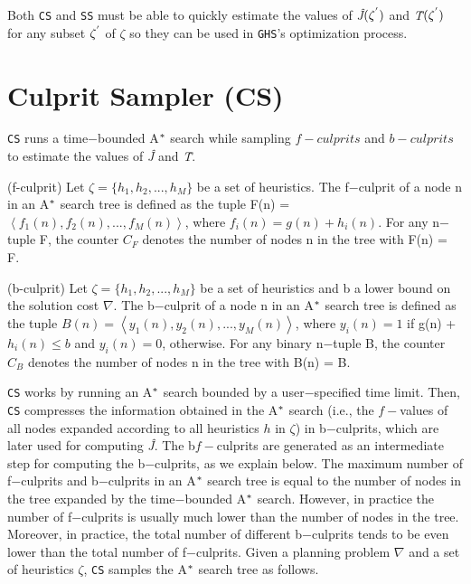 Both \texttt{CS} and \texttt{SS} must be able to quickly estimate the values of \textit{\^{J}}$(\zeta\sp{'})$ and \textit{\^{T}}$(\zeta\sp{'})$ for any subset $\zeta\sp{'}$ of $\zeta$ so they can be used in \texttt{GHS}'s optimization process.

\section{Culprit Sampler (CS)}
\noindent
\texttt{CS} runs a time$-$bounded A$\sp{*}$ search while sampling $f-culprits$ and $b-culprits$ to estimate the values of \textit{\^{J}} and \textit{\^{T}}.

\begin{definition}(f-culprit)
Let $\zeta = \{h_{1}, h_{2},...,h_{M}\}$ be a set of heuristics. The f$-$culprit of a node n in an A$\sp{*}$ search tree is defined as the tuple F(n) = $\left\langle f_{1}(n), f_{2}(n),...,f_{M}(n)  \right\rangle$, where $f_{i}(n) = g(n)+h_{i}(n)$. For any n$-$tuple F, the counter $C_{F}$ denotes the number of nodes n in the tree with F(n) = F.
\label{def:def_fculprits}
\end{definition}

\begin{definition}(b-culprit)
Let $\zeta = \{h_{1}, h_{2},...,h_{M}\}$ be a set of heuristics and b a lower bound on the solution cost $\nabla$. The b$-$culprit of a node n in an A$\sp{*}$ search tree is defined as the tuple $B(n) = \left\langle y_{1}(n), y_{2}(n),...,y_{M}(n)\right\rangle$, where $y_{i}(n) = 1$ if g(n) + $h_{i}(n) \leq b$ and $y_{i}(n) = 0$, otherwise.  For any binary n$-$tuple B, the counter $C_{B}$ denotes the number of nodes n in the tree with B(n) = B.
\label{def:def_bculprits}
\end{definition}

\texttt{CS} works by running an A$\sp{*}$ search bounded by a user$-$specified time limit. Then, \texttt{CS} compresses the information obtained in the A$\sp{*}$ search (\textsf{i.e.,} the $f-$values of all nodes expanded according to all heuristics $h$ in $\zeta$) in b$-$culprits, which are later used for computing \textit{\^{J}}. The b$f-$culprits are generated as an intermediate step for computing the b$-$culprits, as we explain below. The maximum number of f$-$culprits and b$-$culprits in an A$\sp{*}$ search tree is equal to the number of nodes in the tree expanded by the time$-$bounded A$\sp{*}$ search. However, in practice the number of f$-$culprits is usually much lower than the number of nodes in the tree. Moreover, in practice, the total number of different b$-$culprits tends to be even lower than the total number of f$-$culprits. Given a planning problem $\nabla$ and a set of heuristics $\zeta$, \texttt{CS} samples the A$\sp{*}$ search tree as follows.

